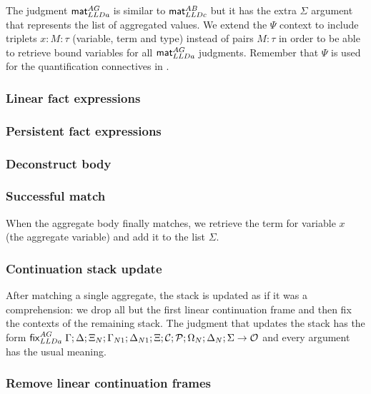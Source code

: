 The judgment $\mathsf{mat}_{LLDa}^{AG} \;$is similar to $\mathsf{mat}_{LLDc}^{AB} \;$but it has the extra $\Sigma$ argument that
represents the list of aggregated values. We extend the $\Psi$ context to
include triplets $x : M : \tau$ (variable, term and type) instead of pairs $M :
\tau$ in order to be able to retrieve bound variables for all $\mathsf{mat}_{LLDa}^{AG} \;$judgments.
Remember that $\Psi$ is used for the quantification connectives in \fragment.

\subsubsection{Linear fact expressions}



\subsubsection{Persistent fact expressions}



\subsubsection{Deconstruct body}



\subsubsection{Successful match}

When the aggregate body finally matches, we retrieve the term for variable $x$
(the aggregate variable) and add it to the list $\Sigma$.



\subsubsection{Continuation stack update}

After matching a single aggregate, the stack is updated as if it was a
comprehension: we drop all but the first linear continuation frame and then fix
the contexts of the remaining stack.  The judgment that updates the stack has
the form $\mathsf{fix}_{LLDa}^{AG} \; \Gamma; \Delta; \Xi_N; \Gamma_{N1}; \Delta_{N1}; \Xi; \mathcal{C};
\mathcal{P}; \Omega_N; \Delta_N; \Sigma \rightarrow \mathcal{O}$ and every argument
has the usual meaning.

\subsubsection{Remove linear continuation frames}

